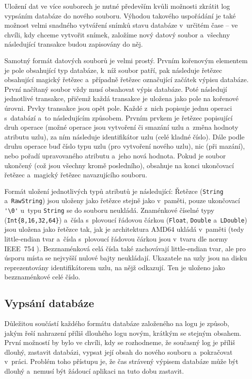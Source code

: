 Uložení dat ve více souborech je nutné především kvůli možnosti zkrátit log
vypsáním databáze do nového souboru. Výhodou
takového uspořádání je také možnost velmi snadného vytváření snímků stavu databáze
v~určitém čase -- ve chvíli, kdy chceme vytvořit snímek, založíme nový datový soubor
a~všechny následující transakce budou zapisovány do něj.

Samotný formát datových souborů je velmi prostý. Prvním kořenovým elementem je pole
obsahující typ databáze, k~níž soubor patří, pak následuje řetězec obsahující magický
řetězec a~případně řetězec označující začátek výpisu databáze. První načítaný soubor
vždy musí obsahovat výpis databáze. Poté následují jednotlivé
transakce, přičemž každá transakce je uložena jako pole na kořenové úrovni. Prvky
transakce jsou opět pole. Každé z~nich popisuje jednu operaci s~databází a~to
následujícím způsobem. Prvním prvkem je řetězec popisující druh operace (možné operace
jsou vytvoření či smazání uzlu a~změna hodnoty atributu uzlu), za ním následuje
identifikátor uzlu (celé kladné číslo). Dále podle druhu operace buď číslo typu uzlu
(pro vytvoření nového uzlu), nic (při mazání), nebo pořadí upravovaného atributu
a~jeho nová hodnota. Pokud je soubor ukončený (což jsou všechny kromě posledního),
obsahuje na konci ukončovací řetězec a~magický řetězec navazujícího souboru.

Formát uložení jednotlivých typů atributů je následující: 
Řetězce (\verb|String| a~\verb|RawString|) jsou uloženy jako řetězce stejně jako v~paměti,
pouze ukončovací \verb|'\0'| u~typu \verb|String| se do souboru neukládá.
Znaménkové číselné typy
(\verb|Int{8,16,32,64}|) a~čísla s~plovoucí řádovou čárkou (\verb|Float|,
\verb|Double| a~\verb|LDouble|) jsou uložena jako řetězce tak,
jak je architektura AMD64 ukládá
v~paměti (tedy little-endian tvar a~čísla s~plovoucí řádovou čárkou
jsou v~tvaru dle normy \hbox{IEEE 754}
\cite{IEEE754}). 
Bezznaménková celá čísla také zachovávají little-endian tvar, ale pro úsporu místa
se nejvyšší nulové bajty neukládají. Ukazatele na uzly jsou na disku reprezentovány
identifikátorem uzlu, na nějž odkazují. Ten je uloženo jako bezznaménkové celé číslo.

\subsection{Vypsání databáze}
Důležitou součástí každého formátu databáze založeného na logu je způsob, jakým
řeší nahrazení příliš dlouhého logu novým, krátkým se stejným obsahem. První možností
by bylo ve chvíli, kdy se rozhodneme, že současný log je příliš dlouhý, zastavit
databázi, vypsat její obsah do nového souboru a~pokračovat v~práci. Problém toho
přístupu je, že čas strávený výpisem databáze může být dlouhý a~nemusí být žádoucí
aplikaci na tuto dobu zastavit.

